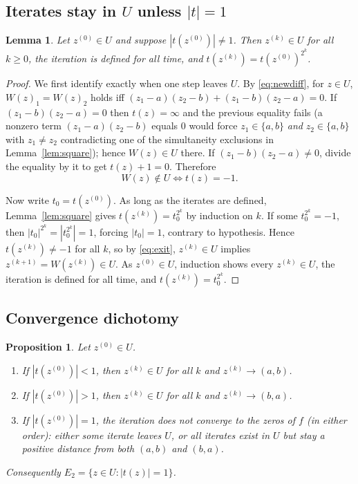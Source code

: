 \documentclass{amsart}
\newtheorem{lemma}{Lemma}
\newtheorem{proposition}{Proposition}
\theoremstyle{definition}
\theoremstyle{remark}
\begin{document}
\subsection{Iterates stay in $U$ unless $|t|=1$}

\begin{lemma}\label{lem:stayU}
Let $z^{(0)}\in U$ and suppose $|t(z^{(0)})|\neq 1$. Then $z^{(k)}\in U$ for all $k\ge 0$,
the iteration is defined for all time, and $t(z^{(k)})=t(z^{(0)})^{2^k}$.
\end{lemma}

\begin{proof}
We first identify exactly when one step leaves $U$. By \eqref{eq:newdiff}, for $z\in U$,
$W(z)_1=W(z)_2$ holds iff $(z_1-a)(z_2-b)+(z_1-b)(z_2-a)=0$. If $(z_1-b)(z_2-a)=0$ then
$t(z)=\infty$ and the previous equality fails (a nonzero term $(z_1-a)(z_2-b)$ equals $0$
would force $z_1\in\{a,b\}$ \emph{and} $z_2\in\{a,b\}$ with $z_1\neq z_2$ contradicting one of
the simultaneity exclusions in Lemma~\ref{lem:square}); hence $W(z)\in U$ there. If
$(z_1-b)(z_2-a)\neq0$, divide the equality by it to get $t(z)+1=0$. Therefore
\begin{equation}\label{eq:exit}
W(z)\notin U \iff t(z)=-1 .
\end{equation}

Now write $t_0=t(z^{(0)})$. As long as the iterates are defined, Lemma~\ref{lem:square}
gives $t(z^{(k)})=t_0^{2^k}$ by induction on $k$. If some $t_0^{2^k}=-1$, then
$|t_0|^{2^k}=|t_0^{2^k}|=1$, forcing $|t_0|=1$, contrary to hypothesis. Hence
$t(z^{(k)})\neq-1$ for all $k$, so by \eqref{eq:exit}, $z^{(k)}\in U$ implies
$z^{(k+1)}=W(z^{(k)})\in U$. As $z^{(0)}\in U$, induction shows every $z^{(k)}\in U$, the
iteration is defined for all time, and $t(z^{(k)})=t_0^{2^k}$.
\end{proof}

\subsection{Convergence dichotomy}

\begin{proposition}\label{prop:dichotomy}
Let $z^{(0)}\in U$.
\begin{enumerate}
\item If $|t(z^{(0)})|<1$, then $z^{(k)}\in U$ for all $k$ and $z^{(k)}\to(a,b)$.
\item If $|t(z^{(0)})|>1$, then $z^{(k)}\in U$ for all $k$ and $z^{(k)}\to(b,a)$.
\item If $|t(z^{(0)})|=1$, the iteration does not converge to the zeros of $f$
(in either order): either some iterate leaves $U$, or all iterates exist in $U$ but stay a
positive distance from both $(a,b)$ and $(b,a)$.
\end{enumerate}
Consequently $E_2=\{z\in U:|t(z)|=1\}$.
\end{proposition}
\end{document}
